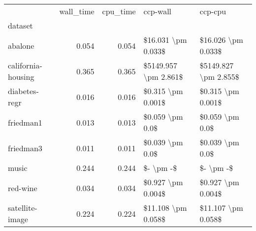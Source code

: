 \begin{tabular}{lrrll}
\toprule
{} &  wall\_time &  cpu\_time &              ccp-wall &               ccp-cpu \\
dataset            &            &           &                       &                       \\
\midrule
abalone            &      0.054 &     0.054 &    \$16.031 \textbackslash pm 0.033\$ &    \$16.026 \textbackslash pm 0.033\$ \\
california-housing &      0.365 &     0.365 &  \$5149.957 \textbackslash pm 2.861\$ &  \$5149.827 \textbackslash pm 2.855\$ \\
diabetes-regr      &      0.016 &     0.016 &     \$0.315 \textbackslash pm 0.001\$ &     \$0.315 \textbackslash pm 0.001\$ \\
friedman1          &      0.013 &     0.013 &       \$0.059 \textbackslash pm 0.0\$ &       \$0.059 \textbackslash pm 0.0\$ \\
friedman3          &      0.011 &     0.011 &       \$0.039 \textbackslash pm 0.0\$ &       \$0.039 \textbackslash pm 0.0\$ \\
music              &      0.244 &     0.244 &             \$- \textbackslash pm -\$ &             \$- \textbackslash pm -\$ \\
red-wine           &      0.034 &     0.034 &     \$0.927 \textbackslash pm 0.004\$ &     \$0.927 \textbackslash pm 0.004\$ \\
satellite-image    &      0.224 &     0.224 &    \$11.108 \textbackslash pm 0.058\$ &    \$11.107 \textbackslash pm 0.058\$ \\
\bottomrule
\end{tabular}
